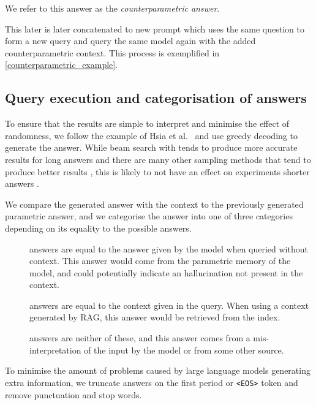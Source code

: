 We refer to this answer as the \emph{counterparametric answer}.

This later is later concatenated to new prompt which uses the same question to form a new query and query the same model again with the added counterparametric context.
This process is exemplified in \cref{counterparametric_example}.

\subsection{Query execution and categorisation of answers}

To ensure that the results are simple to interpret and minimise the effect of randomness, we follow the example of Hsia et al.\ \cite{ragged} and use greedy decoding to generate the answer.
While beam search with tends to produce more accurate results for long answers \cite{sutskever_seq2seqlearning,wu_mltranslation} and there are many other sampling methods that tend to produce better results \cite{text_degeneration}, this is likely to not have an effect on experiments shorter answers \cite{t5}.

We compare the generated answer with the context to the previously generated parametric answer, and we categorise the answer into one of three categories depending on its equality to the possible answers.

\begin{description}
	\item[\Parametric{}] answers are equal to the answer given by the model when queried without context.
		This answer would come from the parametric memory of the model, and could potentially indicate an hallucination not present in the context.
	\item[\Contextual{}] answers are equal to the context given in the query.
		When using a context generated by RAG, this answer would be retrieved from the index.
	\item[\Other] answers are neither of these, and this answer comes from a mis-interpretation of the input by the model or from some other source.
\end{description}

To minimise the amount of problems caused by large language models generating extra information, we truncate answers on the first period or \texttt{<EOS>} token and remove punctuation and stop words.

